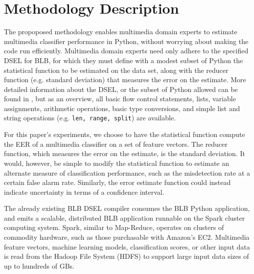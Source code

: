 \section{Methodology Description}

The propoposed methodology enables multimedia domain experts to estimate multimedia classifier performance in Python, without worrying about making the code run efficiently. 
Multimedia domain experts need only adhere to the specified DSEL for BLB, for which they must define with a modest subset of Python the statistical function to be estimated on the data set, along with the reducer function (e.g. standard deviation) that measures the error on the estimate.
More detailed information about the DSEL, or the subset of Python allowed can be found in \cite{pbirsinger2013}, but as an overview, all basic flow control statements, lists, variable assignments, arithmetic operations, basic type conversions, and simple list and string operations (e.g. \texttt{len, range, split}) are available. 

For this paper's experiments, we choose to have the statistical function compute the EER of a multimedia classifier on a set of feature vectors. 
The reducer function, which measures the error on the estimate, is the standard deviation. 
It would, however, be simple to modify the statistical function to estimate an alternate measure of classification performance, such as the misdetection rate at a certain false alarm rate. 
Similarly, the error estimate function could instead indicate uncertainty in terms of a confidence interval.  

The already existing BLB DSEL compiler consumes the BLB Python application, and emits
a scalable, distributed BLB application runnable on the Spark cluster computing system. 
Spark, similar to Map-Reduce, operates on clusters of commodity hardware, such as those purchasable with
Amazon's EC2. Multimedia feature vectors, machine learning models, classification scores, or other input
data is read from the Hadoop File System (HDFS) to support large input data sizes of up to hundreds of GBs. 
